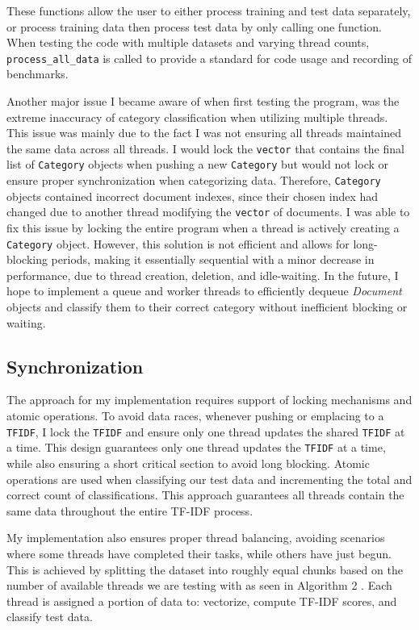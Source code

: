 \documentclass[conference]{IEEEtran}
\newcommand{\code}[1]{\lstinline[basicstyle=\ttfamily]|#1|}
\begin{document}
These functions allow the user to either process training and test data separately, or process training data then process test data by only calling one function. When testing the code with multiple datasets and varying thread counts, \code{process_all_data} is called to provide a standard for code usage and recording of benchmarks.

Another major issue I became aware of when first testing the program, was the extreme inaccuracy of category classification when utilizing multiple threads. This issue was mainly due to the fact I was not ensuring all threads maintained the same data across all threads. I would lock the \code{vector} that contains the final list of \code{Category} objects when pushing a new \code{Category} but would not lock or ensure proper synchronization when categorizing data. Therefore, \code{Category} objects contained incorrect document indexes, since their chosen index had changed due to another thread modifying the \code{vector} of documents. I was able to fix this issue by locking the entire program when a thread is actively creating a \code{Category} object. However, this solution is not efficient and allows for long-blocking periods, making it essentially sequential with a minor decrease in performance, due to thread creation, deletion, and idle-waiting. In the future, I hope to implement a queue and worker threads to efficiently dequeue \textit{Document} objects and classify them to their correct category without inefficient blocking or waiting.

\subsection{Synchronization}
The approach for my implementation requires support of locking mechanisms and atomic operations. To avoid data races, whenever pushing or emplacing to a \code{TFIDF}, I lock the \code{TFIDF} and ensure only one thread updates the shared \code{TFIDF} at a time. This design guarantees only one thread updates the \code{TFIDF} at a time, while also ensuring a short critical section to avoid long blocking. Atomic operations are used when classifying our test data and incrementing the total and correct count of classifications. This approach guarantees all threads contain the same data throughout the entire TF-IDF process.

My implementation also ensures proper thread balancing, avoiding scenarios where some threads have completed their tasks, while others have just begun. This is achieved by splitting the dataset into roughly equal chunks based on the number of available threads we are testing with as seen in Algorithm 2 . Each thread is assigned a portion of data to: vectorize, compute TF-IDF scores, and classify test data.
\end{document}
